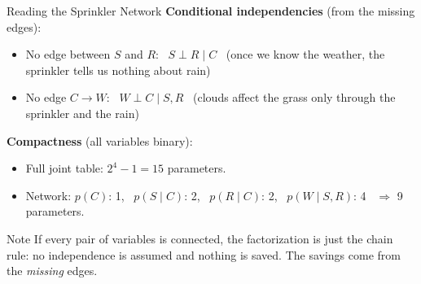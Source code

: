 \documentclass[aspectratio=169]{beamer}
\begin{document}
\begin{frame}{Reading the Sprinkler Network}
\textbf{Conditional independencies} (from the missing edges):
\begin{itemize}
  \item No edge between $S$ and $R$: \ $S \perp R \mid C$ \
        (once we know the weather, the sprinkler tells us nothing about rain)
  \item No edge $C\to W$: \ $W \perp C \mid S, R$ \
        (clouds affect the grass only through the sprinkler and the rain)
\end{itemize}
\vspace{0.2cm}
\textbf{Compactness} (all variables binary):
\begin{itemize}
  \item Full joint table: $2^4 - 1 = 15$ parameters.
  \item Network: $p(C)$: 1, \ $p(S\mid C)$: 2, \ $p(R\mid C)$: 2, \ $p(W\mid S,R)$: 4 \ $\Rightarrow$ 9 parameters.
\end{itemize}
\vspace{0.2cm}
\begin{alertblock}{Note}
If every pair of variables is connected, the factorization is just the chain rule: no independence is assumed and nothing is saved. The savings come from the \emph{missing} edges.
\end{alertblock}
\end{frame}
\end{document}
